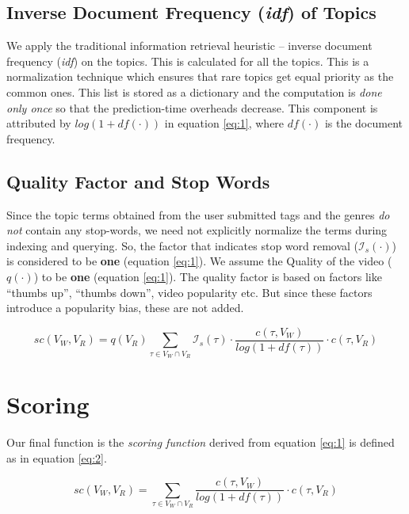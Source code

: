 \subsection{Inverse Document Frequency (\textit{idf}) of Topics}

We apply the traditional information retrieval heuristic -- inverse document frequency (\textit{idf}) on the topics. This is calculated for all the topics. This is a normalization technique which ensures that rare topics get equal priority as the common ones. This list is stored as a dictionary and the computation is \textit{done only once} so that the prediction-time overheads decrease. This component is attributed by $log(1 + df(\cdot))$ in equation \ref{eq:1}, where $df(\cdot)$ is the document frequency.

\subsection{Quality Factor and Stop Words}

Since the topic terms obtained from the user submitted tags and the genres \textit{do not} contain any stop-words, we need not explicitly normalize the terms during indexing and querying. So, the factor that indicates stop word removal ($\mathcal{I}_s(\cdot)$) is considered to be \textbf{one} (equation \ref{eq:1}). We assume the Quality of the video ($q(\cdot)$) to be \textbf{one} (equation \ref{eq:1}). The quality factor is based on factors like ``thumbs up'', ``thumbs down'', video popularity etc. But since these factors introduce a popularity bias, these are not added. 

\begin{equation}
\label{eq:1}
	sc(V_W, V_R) = q(V_R) \sum \limits_{\tau \in V_W \cap V_R} \mathcal{I}_s(\tau) \cdot \frac{c(\tau, V_W)}{log(1 + df(\tau))} \cdot c(\tau, V_R)
\end{equation}

\section{Scoring}

Our final function is the \textit{scoring function} derived from equation \ref{eq:1} is defined as in equation \ref{eq:2}.

\begin{equation}
\label{eq:2}
	sc(V_W, V_R) = \sum \limits_{\tau \in V_W \cap V_R} \frac{c(\tau, V_W)}{log(1 + df(\tau))} \cdot c(\tau, V_R)
\end{equation}

